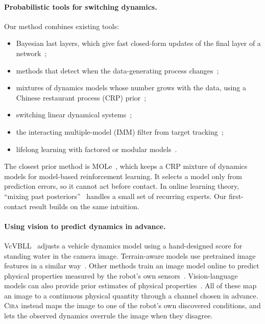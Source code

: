 \documentclass[10pt]{article}
\newcommand{\method}{\textsc{Cira}}
\begin{document}
\paragraph{Probabilistic tools for switching dynamics.}
Our method combines existing tools:
\begin{itemize}
  \item Bayesian last layers, which give fast closed-form updates of the final layer of a
  network~\cite{harrison2018alpaca,harrison2024vbll};
  \item methods that detect when the data-generating process
  changes~\cite{harrison2020moca,adams2007bocpd};
  \item mixtures of dynamics models whose number grows with the data, using a Chinese restaurant process
  (CRP) prior~\cite{nagabandi2019mole,xu2020taskagnostic,jerfel2019reconciling,lee2020cndpm};
  \item switching linear dynamical systems~\cite{fox2011bnpslds,fox2011sticky,linderman2017rslds};
  \item the interacting multiple-model (IMM) filter from target
  tracking~\cite{blom1988imm,mazor1998imm,li1996vsmm};
  \item lifelong learning with factored or modular
  models~\cite{feng2022factored,mendez2022modular,killian2017robust}.
\end{itemize}
The closest prior method is MOLe~\cite{nagabandi2019mole}, which keeps a CRP mixture of dynamics models
for model-based reinforcement learning. It selects a model only from prediction errors, so it cannot
act before contact. In online learning theory, ``mixing past posteriors''~\cite{bousquet2002tracking}
handles a small set of recurring experts. Our first-contact result builds on the same intuition.

\paragraph{Using vision to predict dynamics in advance.}
VcVBLL~\cite{brunzema2026vcvbll} adjusts a vehicle dynamics model using a hand-designed score for
standing water in the camera image. Terrain-aware models use pretrained image features in a similar
way~\cite{gibson2024visualterrain,cai2023probtrav,agarwal2022egocentric}. Other methods train an image
model online to predict physical properties measured by the robot's own
sensors~\cite{loquercio2022crossmodal,margolis2023activesensing,frey2023wvn}. Vision-language models
can also provide prior estimates of physical properties~\cite{gao2024physically,wang2026phys2real}. All
of these map an image to a continuous physical quantity through a channel chosen in advance. \method{}
instead maps the image to one of the robot's own discovered conditions, and lets the observed dynamics
overrule the image when they disagree.
\end{document}
